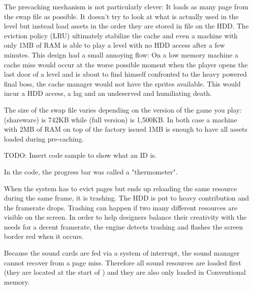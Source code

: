 \documentclass[book.tex]{subfiles}
\begin{document}
 \par
The precaching mechanism is not particularly clever: It loads as many page from the swap file as possible. It doesn't try to look at what is actually used in the level but instead load assets in the order they are stored in  file on the HDD. The eviction policy (LRU) ultimately stabilize the cache and even a machine with only 1MB of RAM is able to play a level with no HDD access after a few minutes. This design had a small annoying flow: On a low memory machine a cache miss would occur at the worse possible moment when the player opens the last door of a level and is about to find himself confronted to the heavy powered final boss, the cache manager would not have the sprites available. This would incur a HDD access, a lag and an undeserved and humiliating death.\\
\par
The size of the swap file varies depending on the version of the game you play:  (shareware) is 742KB while  (full version) is 1,500KB. In both case a machine with 2MB of RAM on top of the factory issued 1MB is enough to have all assets loaded during pre-caching.\\
\par
TODO: Insert code sample to show what an ID is.
\par
{} In the code, the progress bar was called a "thermometer".\\
\par
{} When the system has to evict pages but ends up reloading the same resource during the same frame, it is trashing. The HDD is put to heavy contribution and the framerate drops. Trashing can happen if two many different resources are visible on the screen. In order to help designers balance their creativity with the needs for a decent framerate, the engine detects trashing and flashes the screen border red when it occurs.\\
\par
{} Because the sound cards are fed via a system of interrupt, the sound manager cannot recover from a page miss. Therefore all sound resources are loaded first (they are located at the start of ) and they are also only loaded in Conventional memory.
\end{document}
